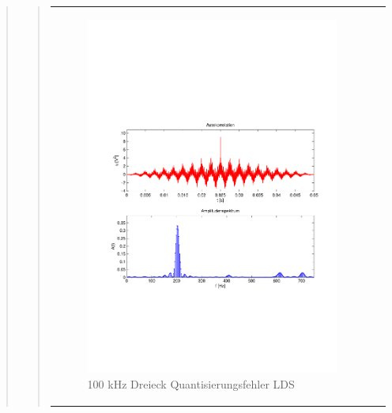 \begin{quote}
\begin{quote}
	   	\begin{center}
            \begin{tabular}{ll}
            
            \hspace{-5cm}
                \begin{minipage}{0.6\textwidth}
                    \begin{figure}[H]
                        \includegraphics[scale=0.55, trim = 16mm 70mm 16mm 85mm, clip]{Bilder/100kHz_dreieck_LSD}
                          \caption{100 kHz Dreieck Quantisierungsfehler LDS}
		                  \label{fig:100kHz_drei_LDS}
                    \end{figure}
                \end{minipage}
                

\end{tabular}
\end{center}
\end{quote}
\end{quote}
